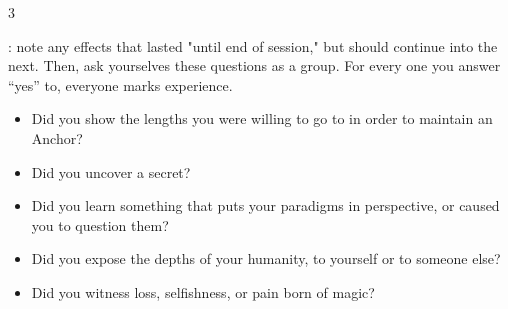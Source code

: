 \begin{multicols}{3}
  \SEPARATOR

  \vspace{-.1in}

  \begin{move}
  \end{move}

  \SEPARATOR

  \vspace{-.1in}

  \begin{move}
  \end{move}

  \SEPARATOR

  \vspace{-.1in}

  \begin{move}
    : note any effects that lasted "until end of session," but should continue into the next. Then, ask yourselves these questions as a group. For every one you answer “yes” to, everyone marks experience.

    \vspace{-.1in}
    
    \begin{itemize}
      \small
      \setlength\itemsep{-0.25em}
    \item Did you show the lengths you were willing to go to in order to maintain an Anchor?
    \item Did you uncover a secret?
    \item Did you learn something that puts your paradigms in perspective, or caused you to question them?
    \item Did you expose the depths of your humanity, to yourself or to someone else?
    \item Did you witness loss, selfishness, or pain born of magic?
    \end{itemize}
  \end{move}
  
\end{multicols}

